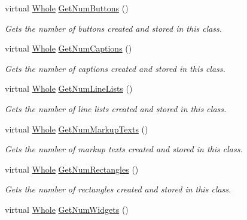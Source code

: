 \begin{DoxyCompactItemize}
virtual \hyperlink{namespaceMezzanine_adcbb6ce6d1eb4379d109e51171e2e493}{Whole} \hyperlink{classMezzanine_1_1UI_1_1Layer_ae339d1ec2ff0c141225ec86167be5e31}{GetNumButtons} ()
\begin{DoxyCompactList}\small\item\em Gets the number of buttons created and stored in this class. \item\end{DoxyCompactList}\item 
virtual \hyperlink{namespaceMezzanine_adcbb6ce6d1eb4379d109e51171e2e493}{Whole} \hyperlink{classMezzanine_1_1UI_1_1Layer_a3aca1c34855d282faef5b5d4c3a5451f}{GetNumCaptions} ()
\begin{DoxyCompactList}\small\item\em Gets the number of captions created and stored in this class. \item\end{DoxyCompactList}\item 
virtual \hyperlink{namespaceMezzanine_adcbb6ce6d1eb4379d109e51171e2e493}{Whole} \hyperlink{classMezzanine_1_1UI_1_1Layer_a4ca051b7cecc316730d0d375becf989f}{GetNumLineLists} ()
\begin{DoxyCompactList}\small\item\em Gets the number of line lists created and stored in this class. \item\end{DoxyCompactList}\item 
virtual \hyperlink{namespaceMezzanine_adcbb6ce6d1eb4379d109e51171e2e493}{Whole} \hyperlink{classMezzanine_1_1UI_1_1Layer_aaa1a666c2c3520a8a39df5c5dea57941}{GetNumMarkupTexts} ()
\begin{DoxyCompactList}\small\item\em Gets the number of markup texts created and stored in this class. \item\end{DoxyCompactList}\item 
virtual \hyperlink{namespaceMezzanine_adcbb6ce6d1eb4379d109e51171e2e493}{Whole} \hyperlink{classMezzanine_1_1UI_1_1Layer_a0832c18bb8c2459c899d14e9fcad8e85}{GetNumRectangles} ()
\begin{DoxyCompactList}\small\item\em Gets the number of rectangles created and stored in this class. \item\end{DoxyCompactList}\item 
virtual \hyperlink{namespaceMezzanine_adcbb6ce6d1eb4379d109e51171e2e493}{Whole} \hyperlink{classMezzanine_1_1UI_1_1Layer_a474f60650b90f1bc2c17dfd8ea5b6304}{GetNumWidgets} ()

\end{DoxyCompactItemize}
